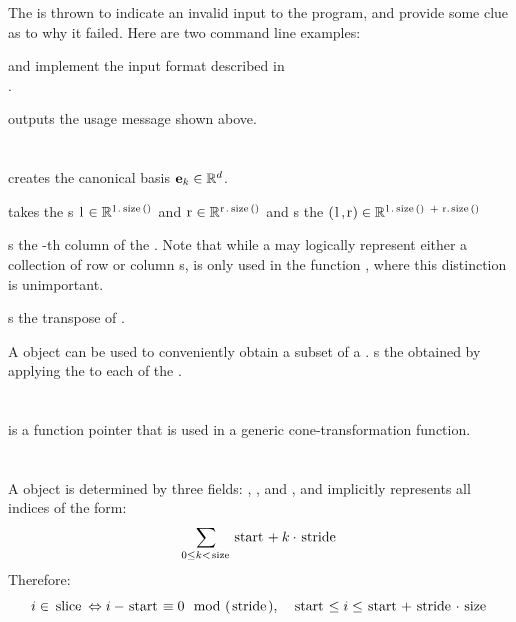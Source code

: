 The  is thrown to indicate an invalid input to the program, and provide some clue as to why it failed.  Here are two command line examples:

\lstinputerror

 and  implement the input format described in \\.
\lstissV
\lstossV

 outputs the usage message shown above.
\lstusage

\section{}
 creates the canonical basis  $\mathbf{e}_k \in \mathbb{R}^d$.
\lstek

 takes the s $\mli{l} \in \R^{\mli{l.size()}}$ and $\mli{r} \in \R^{\mli{r.size()}}$ and s the  $(\mli{l,r}) \in \R^{\mli{l.size() + r.size()}}$
\lstconcatenate

 s the -th column of the .  Note that while a  may logically represent either a collection of row or column s,  is only used in the function , where this distinction is unimportant.
\lstgetcolumn

 s the transpose of .
\lsttranspose

A  object can be used to conveniently obtain a subset of a .   s the  obtained by applying the  to each  of the .
\lstslicematrix

\section{}

 is a function pointer  that is used in a generic cone-transformation function.
\lstLift

\section{}

A  object is determined by three fields: , , and , and implicitly represents all indices of the form:
\[ \sum_{0 \leq k < \mli{size}} \mli{start} + k\cdot\mli{stride} \]
Therefore:
\[ i \in \mli{slice} \Leftrightarrow i - \mli{start} \equiv 0 \mod(\mli{stride}),
	\quad \mli{start} \leq i \leq \mli{start} + {\mli{stride}}\cdot\mli{size} \]
\lstindexinslice

